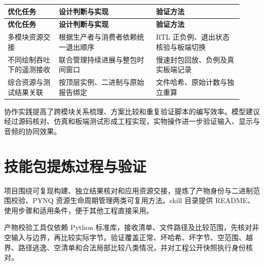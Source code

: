 \documentclass[UTF8,a4paper,12pt]{ctexart}
\begin{document}
{\small\setlength{\tabcolsep}{4pt}\renewcommand{\arraystretch}{1.3}

\begin{longtable}{>{\raggedright\arraybackslash}p{0.2\linewidth}>{\raggedright\arraybackslash}p{0.38\linewidth}>{\raggedright\arraybackslash}p{0.34\linewidth}}

\toprule

\textbf{优化任务} & \textbf{设计判断与实现} & \textbf{验证方法} \\ \midrule

\endfirsthead

\toprule

\textbf{优化任务} & \textbf{设计判断与实现} & \textbf{验证方法} \\ \midrule

\endhead

多模块资源交接 & 根据生产者与消费者依赖统一退出顺序 & RTL 正负例、退出状态核验与板端切换 \\

不同绘制吞吐下的遥测接收 & 联合管理持续进展与整包时间窗口 & 慢速封包回放、负例及真实板端记录 \\

综合资源与测试结果关联 & 按顶层实例、二进制与原始报告绑定 & 文件哈希、原始计数与独立重算 \\

\bottomrule

\end{longtable}

}

协作实践提高了跨模块关系梳理、方案比较和重复验证脚本的编写效率。模型建议经过源码核对、仿真和板端测试形成工程实现，实物操作进一步验证输入、显示与音频的协同效果。\par

\section{技能包提炼过程与验证}

项目围绕可复现构建、独立结果核对和应用资源交接，提炼了产物身份与二进制范围校验、PYNQ 资源生命周期管理两类可复用方法。skill 目录提供 README、使用步骤和适用条件，便于其他工程直接采用。\par

产物校验工具仅依赖 Python 标准库，接收清单、文件路径及比较范围，先核对非空输入与边界，再比较实际字节。验证覆盖正常、坏哈希、坏字节、空范围、越界、路径逃逸、空清单和合法局部比较八类情况，并对工程公开快照执行身份核对。\par
\end{document}
